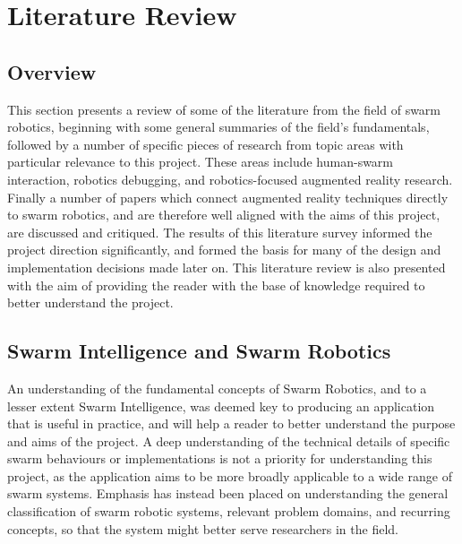 
\chapter[Literature Review]{Literature Review} %

\label{Chapter2} %


\section{Overview}
This section presents a review of some of the literature from the field of swarm robotics, beginning with some general summaries of the field's fundamentals, followed by a number of specific pieces of research from topic areas with particular relevance to this project. These areas include human-swarm interaction, robotics debugging, and robotics-focused augmented reality research. Finally a number of papers which connect augmented reality techniques directly to swarm robotics, and are therefore well aligned with the aims of this project, are discussed and critiqued. The results of this literature survey informed the project direction significantly, and formed the basis for many of the design and implementation decisions made later on. This literature review is also presented with the aim of providing the reader with the base of knowledge required to better understand the project.


\section{Swarm Intelligence and Swarm Robotics} \label{GeneralSwarmRobotics}
An understanding of the fundamental concepts of Swarm Robotics, and to a lesser extent Swarm Intelligence, was deemed key to producing an application that is useful in practice, and will help a reader to better understand the purpose and aims of the project. A deep understanding of the technical details of specific swarm behaviours or implementations is not a priority for understanding this project, as the application aims to be more broadly applicable to a wide range of swarm systems. Emphasis has instead been placed on understanding the general classification of swarm robotic systems, relevant problem domains, and recurring concepts, so that the system might better serve researchers in the field.

